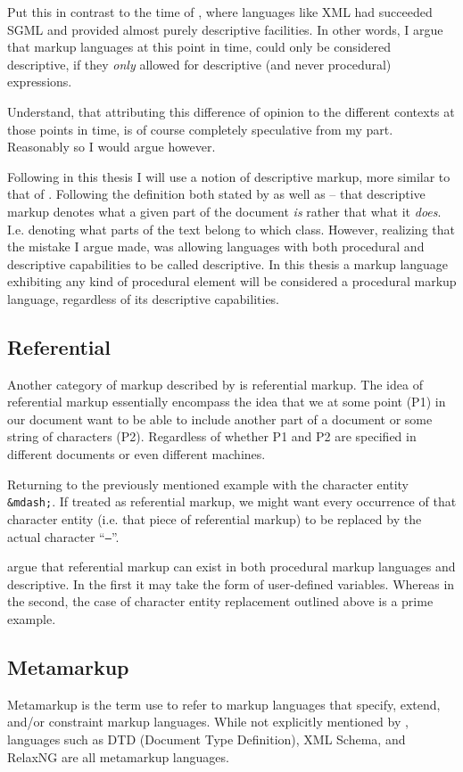 \documentclass{scrreprt}
\begin{document}
Put this in contrast to the time of \citet{bray}, where languages like XML had succeeded SGML and provided almost purely descriptive facilities. In other words, I argue that markup languages at this point in time, could only be considered descriptive, if they \emph{only} allowed for descriptive (and never procedural) expressions.

Understand, that attributing this difference of opinion to the different contexts at those points in time, is of course completely speculative from my part. Reasonably so I would argue however.

Following in this thesis I will use a notion of descriptive markup, more similar to that of \citet{bray}. Following the definition both stated by \citet{coombs} as well as \citet{bray} -- that descriptive markup denotes what a given part of the document \emph{is} rather that what it \emph{does}. I.e. denoting what parts of the text belong to which class. However, realizing that the mistake I argue \citet{coombs} made, was allowing languages with both procedural and descriptive capabilities to be called descriptive. In this thesis a markup language exhibiting any kind of procedural element will be considered a procedural markup language, regardless of its descriptive capabilities.


\subsection{Referential}
\label{sec:referential-markup}
Another category of markup described by \citet{coombs} is referential markup. The idea of referential markup essentially encompass the idea that we at some point (P1) in our document want to be able to include another part of a document or some string of characters (P2). Regardless of whether P1 and P2 are specified in different documents or even different machines.

Returning to the previously mentioned example with the character entity \texttt{\&mdash;}. If treated as referential markup, we might want every occurrence of that character entity (i.e. that piece of referential markup) to be replaced by the actual character ``\texttt{--}''.

\citet{coombs} argue that referential markup can exist in both procedural markup languages and descriptive. In the first it may take the form of user-defined variables. Whereas in the second, the case of character entity replacement outlined above is a prime example.


\subsection{Metamarkup}
Metamarkup is the term \citet{coombs} use to refer to markup languages that specify, extend, and/or constraint markup languages. While not explicitly mentioned by \cite{coombs}, languages such as DTD (Document Type Definition), XML Schema, and RelaxNG are all metamarkup languages.
\end{document}

